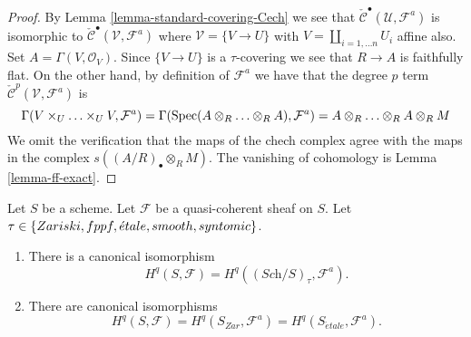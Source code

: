 \begin{proof}
By Lemma \ref{lemma-standard-covering-Cech} we see that
$\check{\mathcal{C}}^\bullet(\mathcal{U}, \mathcal{F}^a)$
is isomorphic to $\check{\mathcal{C}}^\bullet(\mathcal{V}, \mathcal{F}^a)$
where $\mathcal{V} = \{V \to U\}$ with $V = \coprod_{i = 1, \ldots n} U_i$
affine also. Set $A = \Gamma(V, \mathcal{O}_V)$. Since $\{V \to U\}$
is a $\tau$-covering we see that $R \to A$ is faithfully flat.
On the other hand, by definition of $\mathcal{F}^a$ we have
that the degree $p$ term $\check{\mathcal{C}}^p(\mathcal{V}, \mathcal{F}^a)$
is
$$
\Gamma(V \times_U \ldots \times_U V, \mathcal{F}^a)
=
\Gamma(\mathop{\rm Spec}(A \otimes_R \ldots \otimes_R A), \mathcal{F}^a)
=
A\otimes_R \ldots \otimes_R A \otimes_R M
$$
We omit the verification that the maps of the chech complex agree with
the maps in the complex $s((A/R)_\bullet \otimes_R M)$. The vanishing
of cohomology is Lemma \ref{lemma-ff-exact}. 
\end{proof}

\begin{proposition}
\label{proposition-same-cohomology-quasi-coherent}
Let $S$ be a scheme. Let $\mathcal{F}$ be a quasi-coherent sheaf on $S$.
Let $\tau \in \{Zariski,\linebreak[0] fppf,\linebreak[0]
\acute{e}tale,\linebreak[0] smooth,\linebreak[0] syntomic\}$.
\begin{enumerate}
\item There is a canonical isomorphism
$$
H^q(S, \mathcal{F}) = H^q((\textit{Sch}/S)_\tau, \mathcal{F}^a).
$$
\item There are canonical isomorphisms
$$
H^q(S, \mathcal{F}) =
H^q(S_{Zar}, \mathcal{F}^a) =
H^q(S_{\acute{e}tale}, \mathcal{F}^a).
$$
\end{enumerate}
\end{proposition}

